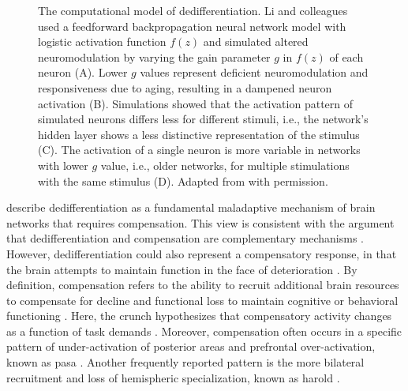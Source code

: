 \begin{figure}[h]
\def\svgwidth{\columnwidth}

\caption[The computational model of dedifferentiation.]{The computational model of dedifferentiation. Li and colleagues \cite{Li2001,Li2002} used a feedforward backpropagation neural network model with logistic activation function $f(z)$ and simulated altered neuromodulation by varying the gain parameter $g$ in $f(z)$ of each neuron (A). Lower $g$ values represent deficient neuromodulation and responsiveness due to aging, resulting in a dampened neuron activation (B). Simulations showed that the activation pattern of simulated neurons differs less for different stimuli, i.e., the network's hidden layer shows a less distinctive representation of the stimulus (C). The activation of a single neuron is more variable in networks with lower $g$ value, i.e., older networks, for multiple stimulations with the same stimulus (D). Adapted from \citeauthor{Li2001} \cite{Li2001} with permission.}
\label{fig:dedifferentiation}
\end{figure}

\noindent  \citeauthor{Fornito2015} \cite{Fornito2015} describe dedifferentiation as a fundamental maladaptive mechanism of brain networks that requires compensation. This view is consistent with the argument that dedifferentiation and compensation are complementary mechanisms \cite{Reuter-Lorenz2010}. However, dedifferentiation could also represent a compensatory response, in that the brain attempts to maintain function in the face of deterioration \cite{Stern2009}. By definition, compensation refers to the ability to recruit additional brain resources to compensate for decline and functional loss to maintain cognitive or behavioral functioning \cite{Reuter-Lorenz2010, Grady2012}. Here, the \gls{crunch} hypothesizes that compensatory activity changes as a function of task demands \cite{Festini2018}. Moreover, compensation often occurs in a specific pattern of under-activation of posterior areas and prefrontal over-activation, known as \gls{pasa} \cite{Davis2007}. Another frequently reported pattern is the more bilateral recruitment and loss of hemispheric specialization, known as \gls{harold} \cite{Cabeza2002}.

